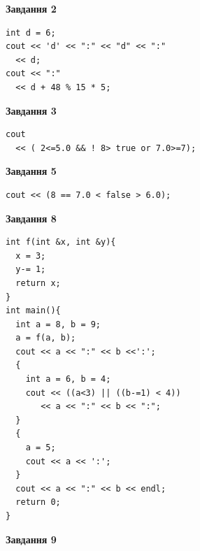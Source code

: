 \documentclass[12pt, ukrainian]{article}
\begin{document}
{\begin {large}
\begin{minipage}[t]{7.0cm}
\end{minipage}
\vline \hspace{1mm}
\begin{minipage}[t]{11.0cm}

\begin{center}
\textbf{Завдання 2}
\end{center}
\vspace{-8mm}

\begin{verbatim}
int d = 6;
cout << 'd' << ":" << "d" << ":" 
  << d;
cout << ":" 
  << d + 48 % 15 * 5;
\end{verbatim}



\begin{center}
\textbf{Завдання 3}
\end{center}
\vspace{-8mm}

\begin{verbatim}
cout 
  << ( 2<=5.0 && ! 8> true or 7.0>=7);
\end{verbatim}



\begin{center}
\textbf{Завдання 5}
\end{center}
\vspace{-8mm}

\begin{verbatim}
cout << (8 == 7.0 < false > 6.0);
\end{verbatim}



\begin{center}
\textbf{Завдання 8}
\end{center}
\vspace{-8mm}

\begin{verbatim}
int f(int &x, int &y){
  x = 3;
  y-= 1;
  return x;
}
int main(){
  int a = 8, b = 9;
  a = f(a, b);
  cout << a << ":" << b <<':';
  {
    int a = 6, b = 4;
    cout << ((a<3) || ((b-=1) < 4))
       << a << ":" << b << ":";
  }
  {
    a = 5;
    cout << a << ':';
  }
  cout << a << ":" << b << endl;
  return 0;
}
\end{verbatim}

\end{minipage}


\begin{minipage}[t]{7.0cm}

\begin{center}
\textbf{Завдання 9}
\end{center}
\vspace{-8mm}


\end{minipage}
\end{large}}
\end{document}
